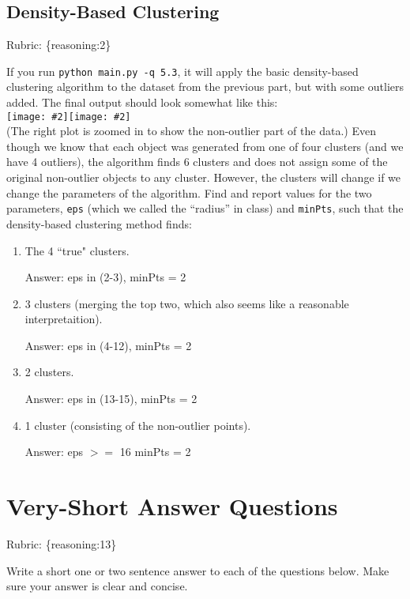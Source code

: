\documentclass{article}
\def\rubric#1{\gre{Rubric: \{#1\}}}{}
\def\ans#1{\par\gre{Answer: #1}}
\def\blu#1{{\color{blu}#1}}
\def\gre#1{{\color{gre}#1}}
\newcommand{\fig}[2]{\texttt{[image: \#2]}}
\def\enum#1{\begin{enumerate}#1\end{enumerate}}
\begin{document}
\subsection{Density-Based Clustering}
\rubric{reasoning:2}

If you run \texttt{python main.py -q 5.3},
it will apply the basic density-based clustering algorithm to the dataset from the previous part, but with some outliers added.
The final output should look somewhat like this:\\
\fig{.49}{../figs/density}\fig{.49}{../figs/density2}\\
(The right plot is zoomed in to show the non-outlier part of the data.)
Even though we know that each object was generated from one of four clusters (and we have 4 outliers),
 the algorithm finds 6 clusters and does not assign some of the original non-outlier
  objects to any cluster. However, the clusters will change if we change the parameters
  of the algorithm. Find and report values for the two
  parameters, \texttt{eps} (which we called the ``radius'' in class) and \texttt{minPts},
   such that the density-based clustering method finds:
\blu{\enum{
		\item The 4 ``true" clusters.
		\ans{eps in (2-3), minPts = 2}
		\item 3 clusters (merging the top two, which also seems like a reasonable interpretaition).
		\ans{eps in (4-12), minPts = 2}
		\item 2 clusters.
		\ans{eps in (13-15), minPts = 2}
		\item 1 cluster (consisting of the non-outlier points).
	   	\ans{eps $>=$ 16 minPts = 2}
}
}



\section{Very-Short Answer Questions}
\rubric{reasoning:13}

\blu{Write a short one or two sentence answer to each of the questions below}. Make sure your answer is clear and concise.
\end{document}
